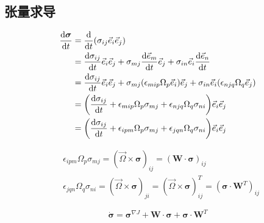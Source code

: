 \subsection{张量求导}
\begin{equation}
    \begin{split}
        \frac{\mathrm{d}\boldsymbol{\sigma}}{\mathrm{d}t}&=\frac{\mathrm{d}}{\mathrm{d}t}(\sigma_{ij}\vec{e}_i\vec{e}_j)\\
        &=\frac{\mathrm{d}\sigma_{ij}}{\mathrm{d}t}\vec{e}_i\vec{e}_j+\sigma_{mj}\frac{\mathrm{d}\vec{e}_m}{\mathrm{d}t}\vec{e}_j+\sigma_{in}\vec{e}_i\frac{\mathrm{d}\vec{e}_n}{\mathrm{d}t}\\
        &=\frac{\mathrm{d}\sigma_{ij}}{\mathrm{d}t}\vec{e}_i\vec{e}_j+\sigma_{mj}\qty(\epsilon_{mip}\Omega_p\vec{e}_i)\vec{e}_j+\sigma_{in}\vec{e}_i\qty(\epsilon_{njq}\Omega_q\vec{e}_j)\\
        &=\qty(\frac{\mathrm{d}\sigma_{ij}}{\mathrm{d}t}+\epsilon_{mip}\Omega_p\sigma_{mj}+\epsilon_{njq}\Omega_q\sigma_{ni})\vec{e}_i\vec{e}_j\\
        &=\qty(\frac{\mathrm{d}\sigma_{ij}}{\mathrm{d}t}+\epsilon_{ipm}\Omega_p\sigma_{mj}+\epsilon_{jqn}\Omega_q\sigma_{ni})\vec{e}_i\vec{e}_j
    \end{split}
\end{equation}

\begin{align}
    &\epsilon_{ipm}\Omega_p\sigma_{mj}=(\vec{\Omega}\times\boldsymbol{\sigma})_{ij}=(\textbf{W}\cdot\boldsymbol{\sigma})_{ij}\\
    &\epsilon_{jqn}\Omega_q\sigma_{ni}=(\vec{\Omega}\times\boldsymbol{\sigma})_{ji}=(\vec{\Omega}\times\boldsymbol{\sigma})^T_{ij}=(\boldsymbol{\sigma}\cdot\textbf{W}^T)_{ij}
\end{align}

\begin{equation}
    \dot{\boldsymbol{\sigma}}=\boldsymbol{\sigma}^{\nabla J}+\textbf{W}\cdot\boldsymbol{\sigma}+\boldsymbol{\sigma}\cdot\textbf{W}^{T}
\end{equation}